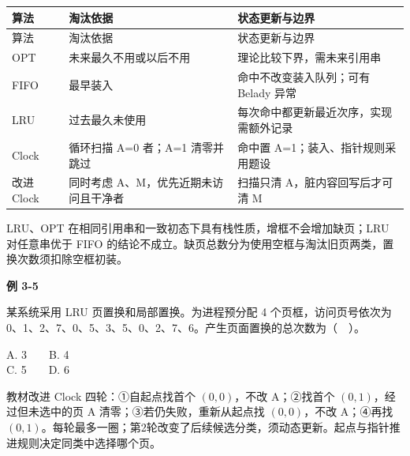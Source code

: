 \par\smallskip
\begin{wideblock}
{\fontsize{9.3}{12}\selectfont\setlength{\tabcolsep}{2.5pt}\setlength{\LTleft}{0pt}\setlength{\LTright}{0pt}
\begin{longtable}{@{}>{\raggedright\arraybackslash}p{}>{\raggedright\arraybackslash}p{}>{\raggedright\arraybackslash}p{}@{}}
\toprule
算法 & 淘汰依据 & 状态更新与边界 \\

\midrule\endfirsthead\toprule
算法 & 淘汰依据 & 状态更新与边界 \\

\midrule\endhead\bottomrule\endfoot
OPT & 未来最久不用或以后不用 & 理论比较下界，需未来引用串 \\

FIFO & 最早装入 & 命中不改变装入队列；可有 Belady 异常 \\

LRU & 过去最久未使用 & 每次命中都更新最近次序，实现需额外记录 \\

Clock & 循环扫描 A=0 者；A=1 清零并跳过 & 命中置 A=1；装入、指针规则采用题设 \\

改进 Clock & 同时考虑 A、M，优先近期未访问且干净者 & 扫描只清 A，脏内容回写后才可清 M \\

\end{longtable}}
\end{wideblock}
\par\smallskip

LRU、OPT 在相同引用串和一致初态下具有栈性质，增框不会增加缺页；LRU 对任意串优于 FIFO 的结论不成立。缺页总数分为使用空框与淘汰旧页两类，置换次数须扣除空框初装。

\par\medskip{}\noindent\hypertarget{OS03-E05}{}\label{OS03-E05}\textbf{例 3-5}\par\nobreak\smallskip

某系统采用 LRU 页置换和局部置换。为进程预分配 4 个页框，访问页号依次为 0、1、2、7、0、5、3、5、0、2、7、6。产生页面置换的总次数为（　）。

A. 3　　B. 4\\
C. 5　　D. 6

教材改进 Clock 四轮：{\SNsymbolfont ①}自起点找首个 \((0,0)\)，不改 A；{\SNsymbolfont ②}找首个 \((0,1)\)，经过但未选中的页 A 清零；{\SNsymbolfont ③}若仍失败，重新从起点找 \((0,0)\)，不改 A；{\SNsymbolfont ④}再找 \((0,1)\)。每轮最多一圈；第2轮改变了后续候选分类，须动态更新。起点与指针推进规则决定同类中选择哪个页。

